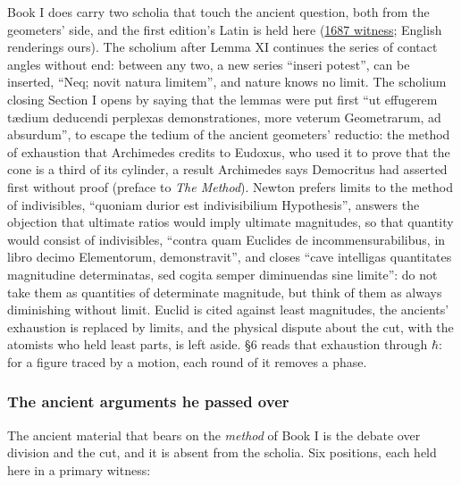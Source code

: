 \documentclass[11pt,a4paper]{article}
\begin{document}
Book I does carry two scholia that touch the ancient question, both from
the geometers' side, and the first edition's Latin is held here
(\href{../docs/classics/Newton_Principia_1687_BookI_SectI_scholia_la_wikisource.md}{1687
witness}; English renderings ours). The scholium after Lemma XI
continues the series of contact angles without end: between any two, a
new series ``inseri potest'', can be inserted, ``Neq; novit natura
limitem'', and nature knows no limit. The scholium closing Section I
opens by saying that the lemmas were put first ``ut effugerem tædium
deducendi perplexas demonstrationes, more veterum Geometrarum, ad
absurdum'', to escape the tedium of the ancient geometers' reductio: the
method of exhaustion that Archimedes credits to Eudoxus, who used it to
prove that the cone is a third of its cylinder, a result Archimedes says
Democritus had asserted first without proof (preface to \emph{The
Method}). Newton prefers limits to the method of indivisibles, ``quoniam
durior est indivisibilium Hypothesis'', answers the objection that
ultimate ratios would imply ultimate magnitudes, so that quantity would
consist of indivisibles, ``contra quam Euclides de incommensurabilibus,
in libro decimo Elementorum, demonstravit'', and closes ``cave
intelligas quantitates magnitudine determinatas, sed cogita semper
diminuendas sine limite'': do not take them as quantities of determinate
magnitude, but think of them as always diminishing without limit. Euclid
is cited against least magnitudes, the ancients' exhaustion is replaced
by limits, and the physical dispute about the cut, with the atomists who
held least parts, is left aside. §6 reads that exhaustion through
\(\hbar\): for a figure traced by a motion, each round of it removes a
phase.

\hypertarget{the-ancient-arguments-he-passed-over}{%
\subsubsection{The ancient arguments he passed
over}\label{the-ancient-arguments-he-passed-over}}

The ancient material that bears on the \emph{method} of Book I is the
debate over division and the cut, and it is absent from the scholia. Six
positions, each held here in a primary witness:
\end{document}
